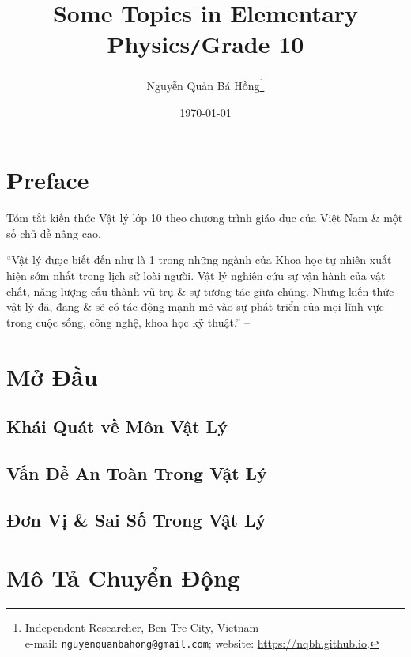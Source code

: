 \documentclass[oneside]{book}
\title{Some Topics in Elementary Physics\texttt{/}Grade 10}
\author{Nguyễn Quản Bá Hồng\footnote{Independent Researcher, Ben Tre City, Vietnam\\e-mail: \texttt{nguyenquanbahong@gmail.com}; website: \url{https://nqbh.github.io}.}}
\date{\today}
\numberwithin{equation}{section}
\begin{document}
\frontmatter
\maketitle
\setcounter{secnumdepth}{4}
\setcounter{tocdepth}{3}
\tableofcontents
\newpage


\mainmatter

\chapter*{Preface}

Tóm tắt kiến thức Vật lý lớp 10 theo chương trình giáo dục của Việt Nam \& một số chủ đề nâng cao.

``Vật lý được biết đến như là 1 trong những ngành của Khoa học tự nhiên xuất hiện sớm nhất trong lịch sử loài người. Vật lý nghiên cứu sự vận hành của vật chất, năng lượng cấu thành vũ trụ \& sự tương tác giữa chúng. Những kiến thức vật lý đã, đang \& sẽ có tác động mạnh mẽ vào sự phát triển của mọi lĩnh vực trong cuộc sống, công nghệ, khoa học kỹ thuật.'' -- \cite{SGK_Vat_Ly_10_Chan_Troi_Sang_Tao}


\chapter{Mở Đầu}

\section{Khái Quát về Môn Vật Lý}

\section{Vấn Đề An Toàn Trong Vật Lý}

\section{Đơn Vị \& Sai Số Trong Vật Lý}


\chapter{Mô Tả Chuyển Động}
\end{document}
